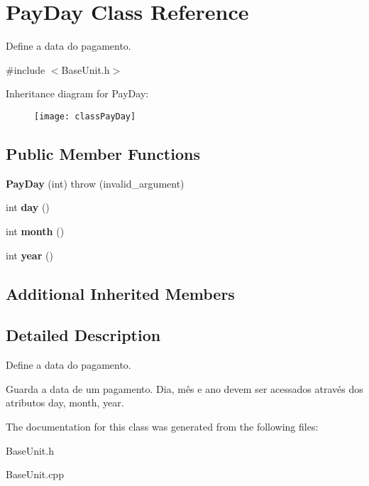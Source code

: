 \hypertarget{classPayDay}{\section{Pay\-Day Class Reference}
\label{classPayDay}
}


Define a data do pagamento.  




{\ttfamily \#include $<$Base\-Unit.\-h$>$}

Inheritance diagram for Pay\-Day\-:\begin{figure}[H]
\begin{center}
\leavevmode
\texttt{[image: classPayDay]}
\end{center}
\end{figure}
\subsection*{Public Member Functions}
\begin{DoxyCompactItemize}
\item 
\hypertarget{classPayDay_a8b78191ec9a71a44086a2ca6a54a2303}{{\bfseries Pay\-Day} (int)  throw (invalid\-\_\-argument)}\label{classPayDay_a8b78191ec9a71a44086a2ca6a54a2303}

\item 
\hypertarget{classPayDay_a297ce892f49aa9f3a504d514f171ed1d}{int {\bfseries day} ()}\label{classPayDay_a297ce892f49aa9f3a504d514f171ed1d}

\item 
\hypertarget{classPayDay_ada65e8834c142a95cd35ca2b399fbcde}{int {\bfseries month} ()}\label{classPayDay_ada65e8834c142a95cd35ca2b399fbcde}

\item 
\hypertarget{classPayDay_a962960925f9e6eaaac0fef5eb96849ec}{int {\bfseries year} ()}\label{classPayDay_a962960925f9e6eaaac0fef5eb96849ec}

\end{DoxyCompactItemize}
\subsection*{Additional Inherited Members}


\subsection{Detailed Description}
Define a data do pagamento. 

Guarda a data de um pagamento. Dia, mês e ano devem ser acessados através dos atributos day, month, year. 

The documentation for this class was generated from the following files\-:\begin{DoxyCompactItemize}
\item 
Base\-Unit.\-h\item 
Base\-Unit.\-cpp\end{DoxyCompactItemize}
